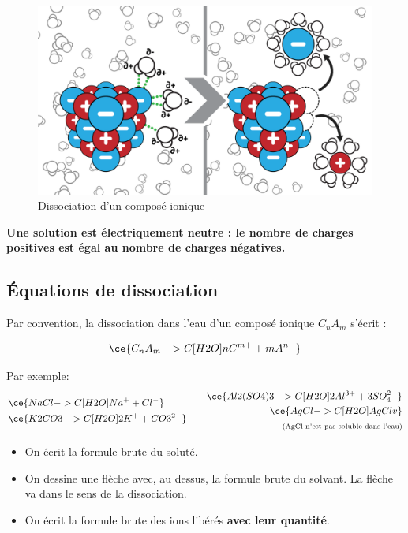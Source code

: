 \documentclass[
  11pt,
  a4paper,
  openany]{book}
\providecommand{\tightlist}{%
  \setlength{\itemsep}{0pt}\setlength{\parskip}{0pt}}
\begin{document}
\begin{figure}

{\centering \includegraphics[width=0.5\linewidth]{images/dissociation} 

}

\caption{Dissociation d'un composé ionique}\label{fig:dissociation}
\end{figure}

\textbf{Une solution est électriquement neutre : le nombre de charges positives est égal au nombre de charges négatives.}

\subsection{Équations de dissociation}\label{uxe9quations-de-dissociation}

Par convention, la dissociation dans l'eau d'un composé ionique \(C_nA_m\) s'écrit :

\[ \ce{C_{n}A_{m} ->C[H2O] n C^{m+} + m A^{n-}} \]

Par exemple:
\[ \begin{split}
  & \ce{NaCl ->C[H2O] Na^{+} + Cl^{-} } \\
  & \ce{K2CO3 ->C[H2O] 2 K^{+} + CO3^{2-} }
  \end{split}
  \qquad
  \begin{split}
  \ce{Al2(SO4)3 ->C[H2O] 2 Al^{3+} + 3 SO_{4}^{2-} } \\
  \ce{AgCl ->C[H2O] AgCl v } \\
  {\scriptsize \text{(AgCl n'est pas soluble dans l'eau)}}
  \end{split} \]

\begin{itemize}
\tightlist
\item
  On écrit la formule brute du soluté.
\item
  On dessine une flèche avec, au dessus, la formule brute du solvant. La flèche va dans le sens de la dissociation.
\item
  On écrit la formule brute des ions libérés \textbf{avec leur quantité}.
\end{itemize}
\end{document}

